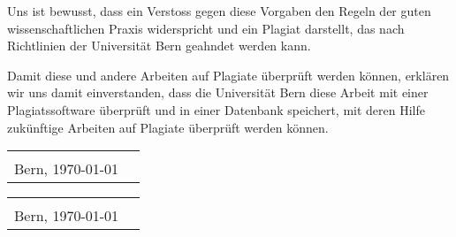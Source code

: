 \documentclass[12pt,a4paper]{scrreprt}
\begin{document}
\begin{titlepage}
{\par
\vspace{\baselineskip}
\noindent
Uns ist bewusst, dass ein Verstoss gegen diese Vorgaben den Regeln der guten wissenschaftlichen Praxis widerspricht und ein Plagiat darstellt, das nach Richtlinien der Universität Bern geahndet werden kann.

\par
\vspace{\baselineskip}
\noindent
Damit diese und andere Arbeiten auf Plagiate überprüft werden können, erklären wir uns damit einverstanden, dass die Universität Bern diese Arbeit mit einer Plagiatssoftware überprüft und in einer Datenbank speichert, mit deren Hilfe zukünftige Arbeiten auf Plagiate überprüft werden können.

\vspace{1.5cm}
\noindent
\begin{tabularx}{\textwidth}{@{}lX}
	&\\
	Bern, \today &  \\
	\cline{2-2}
\end{tabularx}

\vspace{1.5cm}
\noindent
\begin{tabularx}{\textwidth}{@{}lX}
	&\\
	Bern, \today &  \\
	\cline{2-2}
\end{tabularx}
}
\end{titlepage}

\newpage
\cleardoublepage
{}
\setcounter{page}{1}


\par
\vspace{\baselineskip}
\noindent

\printbibliography
\end{document}

